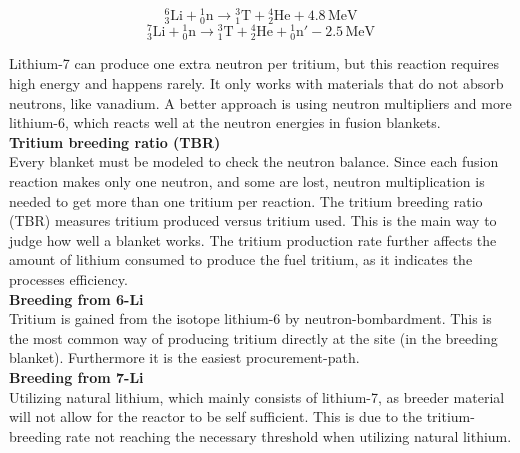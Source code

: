     \begin{equation}
    \label{equ_breedingblanket_1/2}
    {}^{6}_{3}\mathrm{Li} + {}^{1}_{0}\mathrm{n} \rightarrow {}^{3}_{1}\mathrm{T} + {}^{4}_{2}\mathrm{He} + 4.8\,\mathrm{MeV}
    \end{equation}
    \begin{equation}
    \label{equ_breedingblanket_2/2}
    {}^{7}_{3}\mathrm{Li} + {}^{1}_{0}\mathrm{n} \rightarrow {}^{3}_{1}\mathrm{T} + {}^{4}_{2}\mathrm{He} + {}^{1}_{0}\mathrm{n}' - 2.5\,\mathrm{MeV}
    \end{equation}


    Lithium-7 can produce one extra neutron per tritium, but this reaction requires high energy and happens rarely. It only works with materials that do not absorb neutrons, like vanadium. A better approach is using neutron multipliers and more lithium-6, which reacts well at the neutron energies in fusion blankets. \cite{IAEA2018FusionDemo}\\


    \textbf{Tritium breeding ratio (TBR)}\\
    Every blanket must be modeled to check the neutron balance. Since each fusion reaction makes only one neutron, and some are lost, neutron multiplication is needed to get more than one tritium per reaction. The tritium breeding ratio (TBR) measures tritium produced versus tritium used. This is the main way to judge how well a blanket works. \cite{IAEA2018FusionDemo} %
    The tritium production rate further affects the amount of lithium consumed to produce the fuel tritium, as it indicates the processes efficiency. \cite{giegerich2019lithium6}\\ %

    \textbf{Breeding from 6-Li}\\
    Tritium is gained from the isotope lithium-6 by neutron-bombardment. This is the most common way of producing tritium directly at the site (in the breeding blanket). Furthermore it is the easiest procurement-path. \cite{AcostaFlexer2018}\\


    \textbf{Breeding from 7-Li}\\
    Utilizing natural lithium, which mainly consists of lithium-7, as breeder material will not allow for the reactor to be self sufficient. This is due to the tritium-breeding rate not reaching the necessary threshold when utilizing natural lithium. \cite{giegerich2019lithium6}

